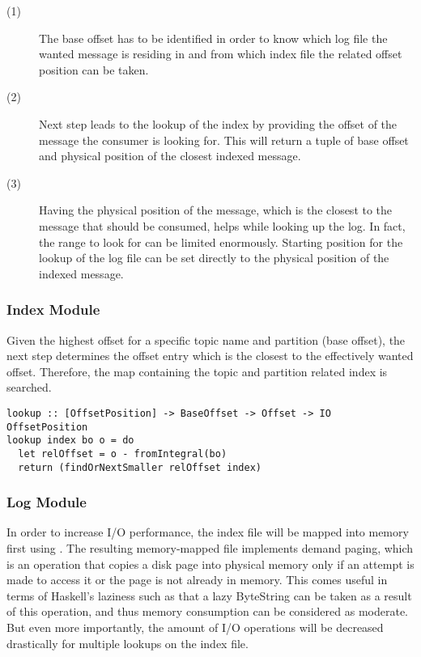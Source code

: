 \begin{description}
  \item[(1)]

    The base offset has to be identified in order to know which log file the
    wanted message is residing in and from which index file the related offset
    position can be taken.

  \item[(2)]

    Next step leads to the lookup of the index by providing the offset of the
    message the consumer is looking for. This will return a tuple of base offset
    and physical position of the closest indexed message.

  \item[(3)]

    Having the physical position of the message, which is the closest to the
    message that should be consumed, helps while looking up the log. In fact,
    the range to look for can be limited enormously. Starting position for the
    lookup of the log file can be set directly to the physical position of the
    indexed message.

\end{description}

\subsubsection{Index Module}

Given the highest offset for a specific topic name and partition (base offset),
the next step determines the offset entry which is the closest to the
effectively wanted offset. Therefore, the map containing the topic and partition
related index is searched.

\begin{lstlisting}
lookup :: [OffsetPosition] -> BaseOffset -> Offset -> IO OffsetPosition
lookup index bo o = do
  let relOffset = o - fromIntegral(bo)
  return (findOrNextSmaller relOffset index)
\end{lstlisting}


\subsubsection{Log Module}

In order to increase I/O performance, the index file will be mapped into memory
first using . The
resulting memory-mapped file implements demand paging, which is an operation
that copies a disk page into physical memory only if an attempt is made to
access it or the page is not already in memory. This comes useful in terms of
Haskell's laziness such as that a lazy ByteString can be taken as a result of
this operation, and thus memory consumption can be considered as moderate. But
even more importantly, the amount of I/O operations will be decreased
drastically for multiple lookups on the index file. 

